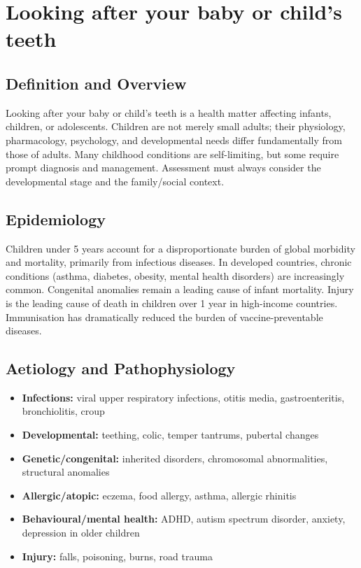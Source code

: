 \chapter{Looking after your baby or child's teeth}

\section*{Definition and Overview}
Looking after your baby or child's teeth is a health matter affecting infants, children, or adolescents. Children are not merely small adults; their physiology, pharmacology, psychology, and developmental needs differ fundamentally from those of adults. Many childhood conditions are self-limiting, but some require prompt diagnosis and management. Assessment must always consider the developmental stage and the family/social context.

\section*{Epidemiology}
Children under 5 years account for a disproportionate burden of global morbidity and mortality, primarily from infectious diseases. In developed countries, chronic conditions (asthma, diabetes, obesity, mental health disorders) are increasingly common. Congenital anomalies remain a leading cause of infant mortality. Injury is the leading cause of death in children over 1 year in high-income countries. Immunisation has dramatically reduced the burden of vaccine-preventable diseases.

\section*{Aetiology and Pathophysiology}
\begin{itemize}
    \item \textbf{Infections:} viral upper respiratory infections, otitis media, gastroenteritis, bronchiolitis, croup
    \item \textbf{Developmental:} teething, colic, temper tantrums, pubertal changes
    \item \textbf{Genetic/congenital:} inherited disorders, chromosomal abnormalities, structural anomalies
    \item \textbf{Allergic/atopic:} eczema, food allergy, asthma, allergic rhinitis
    \item \textbf{Behavioural/mental health:} ADHD, autism spectrum disorder, anxiety, depression in older children
    \item \textbf{Injury:} falls, poisoning, burns, road trauma
\end{itemize}

